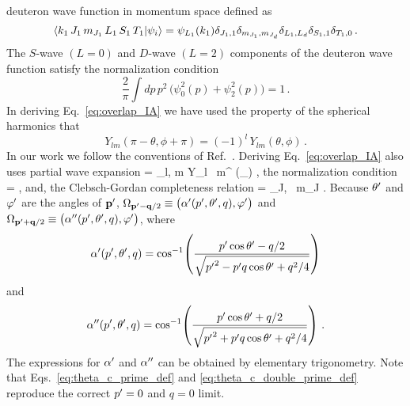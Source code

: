	deuteron wave function in momentum space defined as
	\begin{equation}
	 {\langle k_1 \, J_1 \, m_{J_1} \, L_1 \, S_1 \, T_1|\psi_i\rangle}
	 = \psi_{L_1}(k_1)
	  \delta_{J_1,1}\delta_{m_{J_1},m_{J_d}}
	 \delta_{L_1,L_d}\delta_{S_1,1}\delta_{T_1,0} \,.
  \end{equation}
	The $S$-wave $(L=0)$ and $D$-wave $(L=2)$ components of the deuteron wave
	function satisfy the normalization condition
	\begin{equation}
	 \frac{2}{\pi} \int dp \, p^2 \, \big(\psi_0^2(p) + \psi_2^2(p)\big) = 1 \,.
	\end{equation}
	In deriving Eq.~\eqref{eq:overlap_IA} we have used the property of the
	spherical harmonics that
	\begin{equation}
	 Y_{lm}(\pi-\theta,\phi+\pi) = (-1)^l \, Y_{lm}(\theta,\phi) \,.
	\end{equation}
	In our work we follow the conventions of Ref.~\cite{Landau:1989}.
	Deriving Eq.~\eqref{eq:overlap_IA} also uses partial wave expansion
	\beq
	 =  \sum_{l, m} Y_{l \, m}^\ast
	(\Omega_{})  \;,
	\eeq
	the normalization condition
	\beq
	 =   \;,
	\eeq
	and, the Clebsch-Gordan completeness relation
	\beq
	 = \sum_{J, \, m_J} 
	 \;.
	\eeq
	Because
	$\theta^{\prime}$ and $\varphi^{\prime}$ are the angles of $\mathbf{p^\prime}$, $\Omega_{\mathbf{p^\prime} -
	\mathbf{q}/2} \equiv \big(\alpha^\prime(p^\prime, \theta^{\prime}, q), \varphi^{\prime} \big)$
	and $\Omega_{\mathbf{p^\prime} + \mathbf{q}/2} \equiv
	\big(\alpha^{\prime \prime}(p^\prime, \theta^{\prime}, q),
	\varphi^{\prime} \big)$, where
	\begin{equation}
	 \alpha^\prime (p^\prime, \theta^{\prime}, q) = \cos^{-1}
	 \!\left(
	  \frac{p^\prime \cos \theta^{\prime} - q/2}{\sqrt{{p^\prime}^2 - p^\prime q \cos\theta^{\prime} + q^2/4}}
	 \right)
	\label{eq:theta_c_prime_def}
	\end{equation}
	and
	\begin{equation}
	 \alpha^{\prime \prime} (p^\prime, \theta^{\prime}, q) = \cos^{-1}
	 \!\left(
	  \frac{p^\prime \cos \theta^{\prime} + q/2}{\sqrt{{p^\prime}^2 + p^\prime q \cos\theta^{\prime} + q^2/4}}
	 \right) \,.
	\label{eq:theta_c_double_prime_def}
	\end{equation}
	The expressions for $\alpha^\prime$ and $\alpha^{\prime \prime}$ can be obtained by
	elementary trigonometry.  Note that Eqs.~\eqref{eq:theta_c_prime_def} and
	\eqref{eq:theta_c_double_prime_def} reproduce the correct $p^\prime = 0$ and
	$q = 0$ limit.


